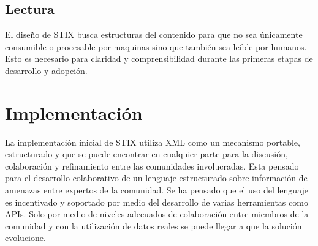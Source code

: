 \subsection{Lectura}
El diseño de STIX busca estructuras del contenido para que no sea únicamente 
consumible o procesable por maquinas sino que también sea leíble por humanos. 
Esto es necesario para claridad y comprensibilidad durante las primeras etapas 
de desarrollo y adopción.

\section{Implementación}
La implementación inicial de STIX utiliza XML como un mecanismo portable, 
estructurado y que se puede encontrar en cualquier parte para la discusión, 
colaboración y refinamiento entre las comunidades involucradas. Esta pensado 
para el desarrollo colaborativo de un lenguaje estructurado sobre información de 
amenazas entre expertos de la comunidad. Se ha pensado que el uso del lenguaje 
es incentivado y soportado por medio del desarrollo de varias herramientas como 
APIs. Solo por medio de niveles adecuados de colaboración entre miembros de la 
comunidad y con la utilización de datos reales se puede llegar a que la solución 
evolucione.



